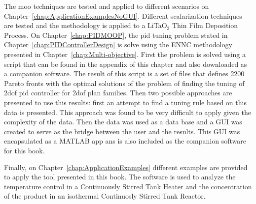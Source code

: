 The \gls{moo} techniques are tested and applied to different scenarios on Chapter~\ref{chap:ApplicationExamplesNoGUI}. Different scalarization techniques are tested and the methodology is applied to a LiTaO$_3$ Thin Film Deposition Process. On Chapter~\ref{chap:PIDMOOP}, the \gls{pid} tuning problem stated in Chapter~\ref{chap:PIDControllerDesign} is solve using the ENNC methodology presented in Chapter~\ref{chap:Multi-objective}. First the problem is solved using a \matlab script that can be found in the appendix of this chapter and also downloaded as a companion software. The result of this script is a set of files that defines 2200 Pareto fronts with the optimal solutions of the problem of finding the tuning of \gls{2dof} \gls{pid} controller for \gls{2dof} plan families. Then two possible approaches are presented to use this results: first an attempt to find a tuning rule based on this data is presented. This approach was found to be very difficult to apply given the complexity of the data. Then the data was used as a data base and a GUI was created to serve as the bridge between the user and the results. This GUI was encapsulated as a MATLAB app ans is also included as the companion software for this book.

Finally, on Chapter~\ref{chap:ApplicationExamples} different examples are provided to apply the tool presented in this book. The software is used to analyze the temperature control in a Continuously Stirred Tank Heater and the concentration of the product in an isothermal Continuosly Stirred Tank Reactor.


